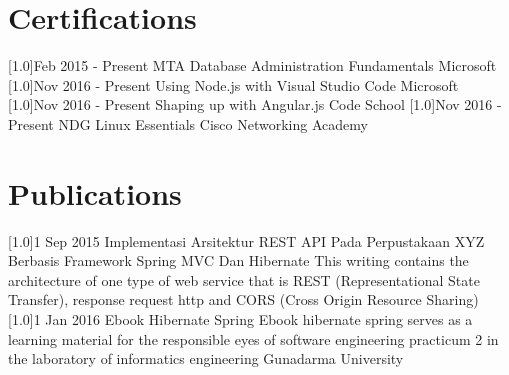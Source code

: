 \documentclass[english]{cv-style}
\begin{document}
\section{Certifications}
\vspace{-0.3cm}
\begin{entrylist}
\entry
{\scalebox{.8}[1.0]{Feb 2015 - Present}}
{MTA Database Administration Fundamentals}
{Microsoft}
{}
\entry
{\scalebox{.8}[1.0]{Nov 2016 - Present}}
{Using Node.js with Visual Studio Code}
{Microsoft}
{}
\entry
{\scalebox{.8}[1.0]{Nov 2016 - Present}}
{Shaping up with Angular.js}
{Code School}
{}
\entry
{\scalebox{.8}[1.0]{Nov 2016 - Present}}
{NDG Linux Essentials}
{Cisco Networking Academy}
{}
\end{entrylist}
\section{Publications}
\vspace{-0.2cm}
\begin{entrylist}
\entry
{\scalebox{.8}[1.0]{1 Sep 2015}}
{Implementasi Arsitektur REST API Pada Perpustakaan XYZ Berbasis Framework Spring MVC Dan Hibernate}
{}
{This writing contains the architecture of one type of web service that is REST (Representational State Transfer), response request http and CORS (Cross Origin Resource Sharing)}
\entry
{\scalebox{.8}[1.0]{1 Jan 2016}}
{Ebook Hibernate Spring}
{}
{Ebook hibernate spring serves as a learning material for the responsible eyes of software engineering practicum 2 in the laboratory of informatics engineering Gunadarma University}
\end{entrylist}
\end{document}
